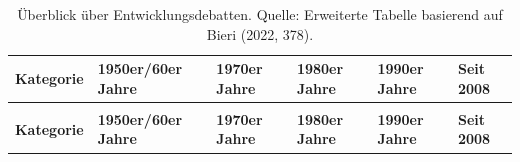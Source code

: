 \documentclass[
  nswissgerman,
  a4paper,
  openany]{book}
\begin{document}
\begin{longtable}[t]{>{\raggedright\arraybackslash}p{1.6cm}>{\raggedright\arraybackslash}p{2.3cm}>{\raggedright\arraybackslash}p{2.3cm}>{\raggedright\arraybackslash}p{2.3cm}>{\raggedright\arraybackslash}p{2.3cm}>{\raggedright\arraybackslash}p{2.3cm}}

\caption{\label{tbl-development-theories}Überblick über
Entwicklungsdebatten. Quelle: Erweiterte Tabelle basierend auf Bieri
(2022, 378).}

\tabularnewline

\toprule
\textbf{Kategorie} & \textbf{1950er/60er Jahre} & \textbf{1970er Jahre} & \textbf{1980er Jahre} & \textbf{1990er Jahre} & \textbf{Seit 2008}\\
\midrule
\endfirsthead
\multicolumn{6}{@{}l}{\textit{(continued)}}\\
\toprule
\textbf{Kategorie} & \textbf{1950er/60er Jahre} & \textbf{1970er Jahre} & \textbf{1980er Jahre} & \textbf{1990er Jahre} & \textbf{Seit 2008}\\
\midrule
\endhead


\end{longtable}
\end{document}
